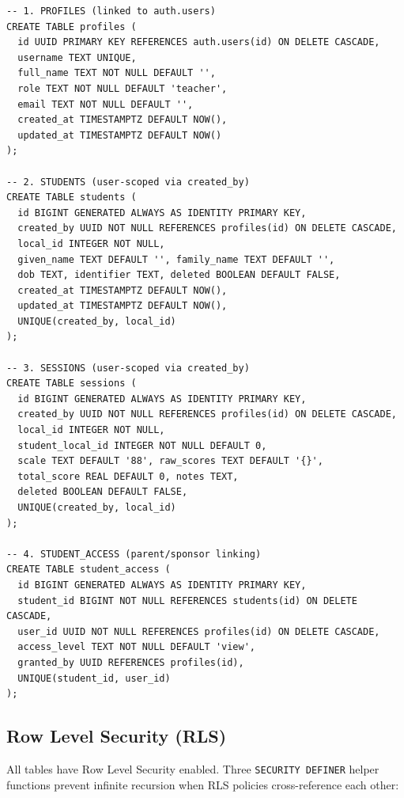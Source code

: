 \documentclass[12pt,a4paper]{article}
\begin{document}
\begin{lstlisting}[style=sql, caption={Supabase cloud schema — core tables}]
-- 1. PROFILES (linked to auth.users)
CREATE TABLE profiles (
  id UUID PRIMARY KEY REFERENCES auth.users(id) ON DELETE CASCADE,
  username TEXT UNIQUE,
  full_name TEXT NOT NULL DEFAULT '',
  role TEXT NOT NULL DEFAULT 'teacher',
  email TEXT NOT NULL DEFAULT '',
  created_at TIMESTAMPTZ DEFAULT NOW(),
  updated_at TIMESTAMPTZ DEFAULT NOW()
);

-- 2. STUDENTS (user-scoped via created_by)
CREATE TABLE students (
  id BIGINT GENERATED ALWAYS AS IDENTITY PRIMARY KEY,
  created_by UUID NOT NULL REFERENCES profiles(id) ON DELETE CASCADE,
  local_id INTEGER NOT NULL,
  given_name TEXT DEFAULT '', family_name TEXT DEFAULT '',
  dob TEXT, identifier TEXT, deleted BOOLEAN DEFAULT FALSE,
  created_at TIMESTAMPTZ DEFAULT NOW(),
  updated_at TIMESTAMPTZ DEFAULT NOW(),
  UNIQUE(created_by, local_id)
);

-- 3. SESSIONS (user-scoped via created_by)
CREATE TABLE sessions (
  id BIGINT GENERATED ALWAYS AS IDENTITY PRIMARY KEY,
  created_by UUID NOT NULL REFERENCES profiles(id) ON DELETE CASCADE,
  local_id INTEGER NOT NULL,
  student_local_id INTEGER NOT NULL DEFAULT 0,
  scale TEXT DEFAULT '88', raw_scores TEXT DEFAULT '{}',
  total_score REAL DEFAULT 0, notes TEXT,
  deleted BOOLEAN DEFAULT FALSE,
  UNIQUE(created_by, local_id)
);

-- 4. STUDENT_ACCESS (parent/sponsor linking)
CREATE TABLE student_access (
  id BIGINT GENERATED ALWAYS AS IDENTITY PRIMARY KEY,
  student_id BIGINT NOT NULL REFERENCES students(id) ON DELETE CASCADE,
  user_id UUID NOT NULL REFERENCES profiles(id) ON DELETE CASCADE,
  access_level TEXT NOT NULL DEFAULT 'view',
  granted_by UUID REFERENCES profiles(id),
  UNIQUE(student_id, user_id)
);
\end{lstlisting}

\subsection{Row Level Security (RLS)}

All tables have Row Level Security enabled. Three \texttt{SECURITY DEFINER} helper functions prevent infinite recursion when RLS policies cross-reference each other:
\end{document}

